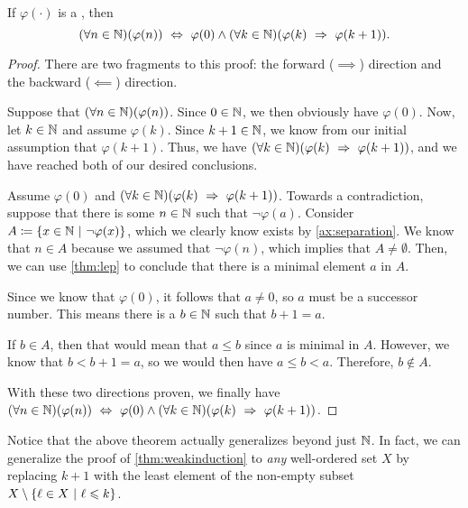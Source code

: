 \begin{theorem}\label{thm:weakinduction}
    If $\varphi(\cdot)$ is a {\wff}, then
    \[
        \pn*{\forall n \in \N}\pn*{\varphi(n)}
        \iff \varphi(0) \meet \pn*{\forall k \in \N}\pn*{\varphi(k) \implies \varphi(k + 1)}.
    \]
\end{theorem}
\begin{proof}
    There are two fragments to this proof:
    the forward ($\implies$) direction and the backward ($\impliedby$) direction.
    \begin{case}
        Suppose that $\pn*{\forall n \in \N}\pn*{\varphi(n)}$.
        Since $0 \in \mathbb{N}$, we then obviously have $\varphi(0)$.
        Now, let $k \in \mathbb{N}$ and assume $\varphi(k)$.
        Since $k + 1 \in \mathbb{N}$, we know from our initial assumption that $\varphi(k + 1)$.
        Thus, we have $\pn*{\forall k \in \N}\pn*{\varphi(k) \implies \varphi(k + 1)}$,
        and we have reached both of our desired conclusions.
    \end{case}
    \begin{case}
        Assume $\varphi(0)$ and $\pn*{\forall k \in \N}\pn*{\varphi(k) \implies \varphi(k + 1)}$.
        Towards a contradiction,
        suppose that there is some $n \in \mathbb{N}$ such that $\neg \varphi(a)$.
        Consider $A \defn \set*{x \in \N \suchthat \neg \varphi(x)}$,
        which we clearly know exists by \autoref{ax:separation}.
        We know that $n \in A$ because we assumed that $\neg \varphi(n)$,
        which implies that $A \neq \emptyset$.
        Then, we can use \autoref{thm:lep} to conclude that there is a minimal element $a$ in $A$.

        Since we know that $\varphi(0)$, it follows that $a \neq 0$, so $a$ must be a successor number.
        This means there is a $b \in \mathbb{N}$ such that $b + 1 = a$.

        If $b \in A$, then that would mean that $a \leq b$ since $a$ is minimal in $A$.
        However, we know that $b < b + 1 = a$, so we would then have $a \leq b < a$. \contradiction
        Therefore, $b \not \in A$.
    \end{case}
    With these two directions proven, we finally have
    $\pn*{\forall n \in \N}\pn*{\varphi(n)}
    \iff \varphi(0) \meet \pn*{\forall k \in \N}\pn*{\varphi(k) \implies \varphi(k + 1)}$.
\end{proof}

Notice that the above theorem actually generalizes beyond just $\mathbb{N}$.
In fact, we can generalize the proof of \autoref{thm:weakinduction}
to \emph{any} well-ordered set $X$ by replacing $k + 1$
with the least element of the non-empty subset $X \setminus \set*{\ell \in X \suchthat \ell \leq k}$.

